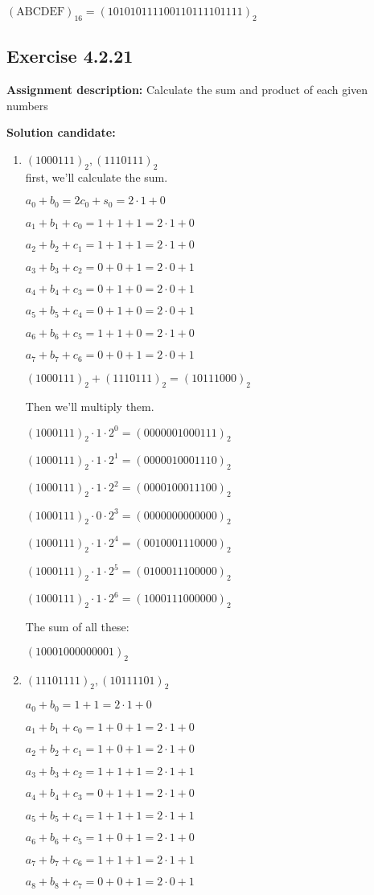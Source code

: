\documentclass{report}
\newcommand{\cent}[1]{\begin{center}#1\end{center}}
\newcommand{\AssignmentDescription}{\textbf{Assignment description: }}
\newcommand{\Solution}{\textbf{Solution candidate: }}
\newcommand{\Exercise}[1]{\subsection{Exercise #1}}
\newcommand{\defaultEnumerateLabel}{\textbf{\alph*.}}
\newcommand{\MyItem}[1]{\item #1\\}
\newcommand{\binary}[1]{(#1)_2}
\newcommand{\hexadec}[1]{(\text{#1})_{16}}
\begin{document}
\begin{enumerate}[label=\defaultEnumerateLabel]
	\cent{$\hexadec{ABCDEF} = \binary{101010111100110111101111}$}
	
	
	\Exercise{4.2.21}
	
	\AssignmentDescription Calculate the sum and product of each given numbers
	
	\Solution
	\begin{enumerate}[label=\defaultEnumerateLabel]
		\MyItem{$\binary{1000111}, \binary{1110111}$}
		
		first, we'll calculate the sum.\\
		
		\cent{$a_0 + b_0 = 2 c_0 + s_0 = 2 \cdot 1 + 0$}
		\cent{$a_1 + b_1 + c_0 = 1 + 1 + 1 = 2 \cdot 1 + 0$}
		\cent{$a_2 +b_2 + c_1 = 1 + 1 + 1 = 2 \cdot 1 + 0$}
		\cent{ $a_3 + b_3 + c_2 = 0 + 0 + 1 = 2 \cdot 0 + 1$}
		\cent{$a_4 + b_4 + c_3 = 0 + 1 + 0 = 2 \cdot 0 + 1 $}
		\cent{$a_5 + b_5 + c_4 = 0 + 1 + 0 = 2 \cdot 0 + 1$}
		\cent{$a_6 + b_6 + c_5 = 1 + 1 + 0 = 2 \cdot 1 + 0$}
		\cent{$a_7 + b_7 + c_6 = 0 + 0 + 1 = 2 \cdot 0 + 1$}
		
		\cent{$\binary{1000111} + \binary{1110111} = \binary{10111000}$}
		
		Then we'll multiply them.\\
		
		\cent{$\binary{1000111} \cdot 1 \cdot 2^0 = \binary{0000001000111}$}
		\cent{$\binary{1000111} \cdot 1 \cdot 2^1 = \binary{0000010001110}$}
		\cent{$\binary{1000111} \cdot 1 \cdot 2^2 = \binary{0000100011100}$}
		\cent{$\binary{1000111} \cdot 0 \cdot 2^3 = \binary{0000000000000}$}
		\cent{$\binary{1000111} \cdot 1 \cdot 2^4 = \binary{0010001110000}$}
		\cent{$\binary{1000111} \cdot 1 \cdot 2^5 = \binary{0100011100000}$}
		\cent{$\binary{1000111} \cdot 1 \cdot 2^6 = \binary{1000111000000}$}
		The sum of all these:
		\cent{$\binary{10001000000001}$}
		
		\MyItem{$\binary{11101111}, \binary{10111101}$}
		
		\cent{$a_0 + b_0 = 1 + 1 = 2 \cdot 1 + 0$}
		\cent{$a_1 + b_1 + c_0 = 1 + 0 +1 = 2 \cdot 1 + 0 $}
		\cent{$a_2 + b_2 + c_1 = 1 + 0 +1 = 2 \cdot 1 + 0 $}
		\cent{$a_3 + b_3 + c_2 = 1 + 1 +1 = 2 \cdot 1 + 1 $}
		\cent{$a_4 + b_4 + c_3 = 0 + 1 +1 = 2 \cdot 1 + 0 $}
		\cent{$a_5 + b_5 + c_4 = 1 + 1 +1 = 2 \cdot 1 + 1 $}
		\cent{$a_6 + b_6 + c_5 = 1 + 0 +1 = 2 \cdot 1 + 0 $}
		\cent{$a_7 + b_7 + c_6 = 1 + 1 +1 = 2 \cdot 1 + 1 $}
		\cent{$a_8 + b_8 + c_7 = 0 + 0 +1 = 2 \cdot 0 + 1 $}
		

\end{enumerate}
\end{enumerate}
\end{document}
